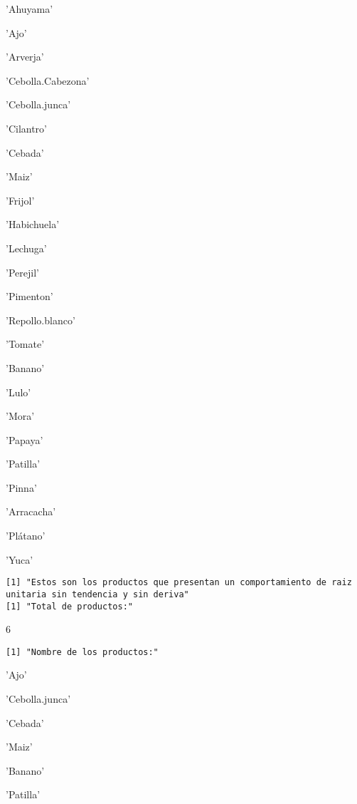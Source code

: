 \documentclass[11pt]{article}
\begin{document}
    \begin{enumerate*}
\item 'Ahuyama'
\item 'Ajo'
\item 'Arverja'
\item 'Cebolla.Cabezona'
\item 'Cebolla.junca'
\item 'Cilantro'
\item 'Cebada'
\item 'Maiz'
\item 'Frijol'
\item 'Habichuela'
\item 'Lechuga'
\item 'Perejil'
\item 'Pimenton'
\item 'Repollo.blanco'
\item 'Tomate'
\item 'Banano'
\item 'Lulo'
\item 'Mora'
\item 'Papaya'
\item 'Patilla'
\item 'Pinna'
\item 'Arracacha'
\item 'Plátano'
\item 'Yuca'
\end{enumerate*}


    
    \begin{Verbatim}[commandchars=\\\{\}]
[1] "Estos son los productos que presentan un comportamiento de raiz unitaria sin tendencia y sin deriva"
[1] "Total de productos:"

    \end{Verbatim}

    6

    
    \begin{Verbatim}[commandchars=\\\{\}]
[1] "Nombre de los productos:"

    \end{Verbatim}

    \begin{enumerate*}
\item 'Ajo'
\item 'Cebolla.junca'
\item 'Cebada'
\item 'Maiz'
\item 'Banano'
\item 'Patilla'
\end{enumerate*}
\end{document}
